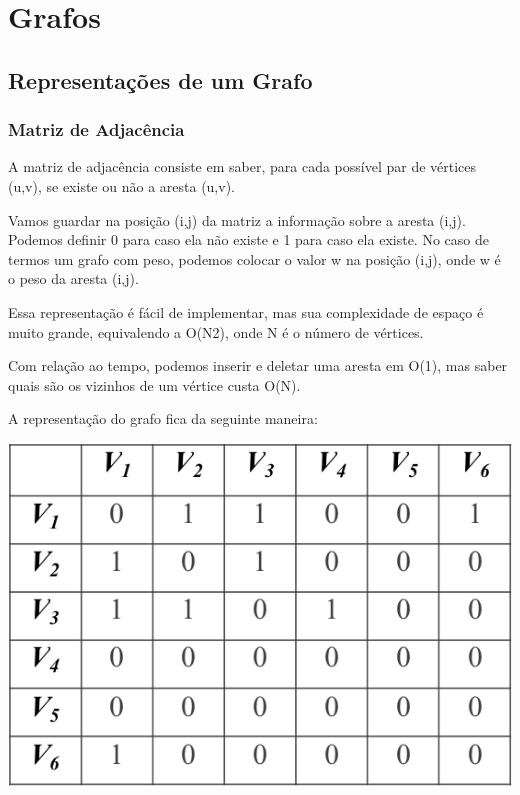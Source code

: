 \documentclass[a4paper,12pt]{article}
\begin{document}
\section{Grafos}
\subsection{Representações de um Grafo}
\subsubsection{Matriz de Adjacência}

\indent\indent A matriz de adjacência consiste em saber, para cada possível par de vértices (u,v), se existe ou não a aresta (u,v).

\indent Vamos guardar na posição (i,j) da matriz a informação sobre a aresta (i,j). Podemos definir 0 para caso ela não existe e 1 para caso ela existe. No caso de termos um grafo com peso, podemos colocar o valor w na posição (i,j), onde w é o peso da aresta (i,j).

\indent Essa representação é fácil de implementar, mas sua complexidade de espaço é muito grande, equivalendo a O(N2), onde N é o número de vértices.

\indent Com relação ao tempo, podemos inserir e deletar uma aresta em O(1), mas saber quais são os vizinhos de um vértice custa O(N).

\indent A representação do grafo fica da seguinte maneira:

\begin{center}
  \includegraphics[width=\linewidth/2]{figures/grafos/representacao_matriz_adj.png}
\end{center}
\end{document}
